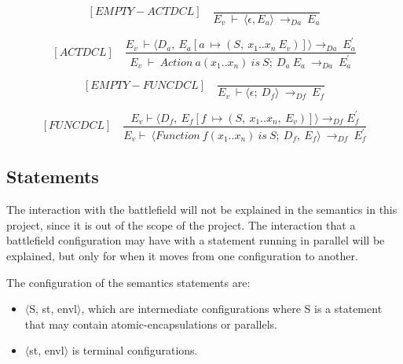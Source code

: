 	
	
	
	
	\[	
	[EMPTY-ACTDCL] \quad	
	\dfrac{}{E_v \ \vdash \ \langle \epsilon, E_a \rangle \ \rightarrow_{Da} \ E_a}	
	\]
	
	
	
	
	
	
	
	
	\[	
	[ACTDCL] \quad	
	\dfrac{E_v \ \vdash \langle D_a, \ E_a[a \ \mapsto (S, \ x_1 .. x_n \ E_v)] \rangle \rightarrow_{Da} \ E_a^{'}}{E_v \ \vdash \ Action \ a(x_1 .. x_n) \ is \ S; \ D_a \ E_a \ \rightarrow_{Da} \ E_a^{'}}	
	\]
	
	
	
	
	
	\[	
	[EMPTY-FUNCDCL] \quad	
	\dfrac{}{E_v \ \vdash \langle \epsilon; \ D_f \rangle \ \rightarrow_{Df} \ E_f}	
	\]
	
	
	
	
	
	\[	
	[FUNCDCL] \quad	
	\dfrac{E_v \vdash \langle D_f, \ E_f[f \ \mapsto (S, \ x_1 .. x_n, \ E_v)] \rangle \rightarrow_{Df} E_f^{'}}{E_v \vdash \ \langle Function \ f(x_1 .. x_n) \ is \ S; \ D_f, \ E_f \rangle \ \rightarrow_{Df} \ E_f^{'}}	
	\]
	
	
	\subsection{Statements}
	
	
	The interaction with the battlefield will not be explained in the semantics in this project, since it is out of the scope of the project. The interaction that a battlefield configuration may have with a statement running in parallel will be explained, but only for when it moves from one configuration to another.
	
	
	
	
	
	The configuration of the semantics statements are:
	
	
	
	
	
	\begin{itemize}
		
		
		\item \begin{math} \langle \end{math}S, st, envl\begin{math} \rangle \end{math}, which are intermediate configurations where S is a statement that may contain atomic-encapsulations or parallels.
		
		
		\item \begin{math} \langle \end{math}st, envl\begin{math} \rangle \end{math} is terminal configurations.
		
		
	\end{itemize}
	
